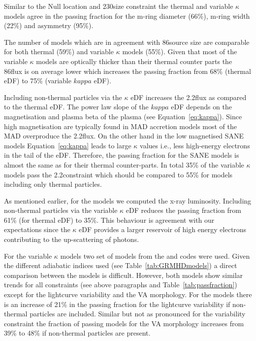 Similar to the Null location and 230\GHz size constraint the thermal and variable $\kappa$ models agree in the passing fraction for the m-ring diameter (66\%), m-ring width (22\%) and asymmetry (95\%).


The number of models which are in agreement with 86\GHz source size are comparable for both thermal (59\%) and variable $\kappa$ models (55\%).
Given that most of the variable $\kappa$ models are optically thicker than their thermal counter parts the 86\GHz flux is on average lower which increases the passing fraction from 68\% (thermal eDF) to 75\% (variable $kappa$ eDF).


Including non-thermal particles via the $\kappa$ eDF increases the 2.2\um flux as compared to the thermal eDF.
The power law slope of the $kappa$ eDF depends on the magnetisation and plasma beta of the plasma (see Equation~\ref{eq:kappa}).
Since high magnetisation are typically found in MAD accretion models most of the MAD overproduce the 2.2\um flux.
On the other hand in the low magnetised SANE models Equation~\ref{eq:kappa} leads to large $\kappa$ values i.e., less high-energy electrons in the tail of the eDF.
Therefore, the passing fraction for the SANE models is almost the same as for their thermal counter-parts.
In total 35\% of the variable $\kappa$ models pass the 2.2\um constraint which should be compared to 55\% for models including only thermal particles.


As mentioned earlier, for the \hamr models we computed the x-ray luminosity.
Including non-thermal particles via the variable $\kappa$ eDF reduces the passing fraction from 61\% (for thermal eDF) to 35\%.
This behaviour is agreement with our expectations since the $\kappa$ eDF provides a larger reservoir of high energy electrons contributing to the up-scattering of photons.


For the variable $\kappa$ models two set of models from the \bhac and \hamr codes were used.
Given the different adiabatic indices used (see Table~\ref{tab:GRMHDmodels}) a direct comparison between the models is difficult.
However, both models show similar trends for all constraints (see above paragraphs and Table~\ref{tab:passfraction}) except for the lightcurve variability and the VA morphology.
For the \hamr models there is an increase of 21\% in the passing fraction for the lightcurve variability if non-thermal particles are included.
Similar but not as pronounced for the variability constraint the fraction of passing models for the VA morphology increases from 39\% to 48\% if non-thermal particles are present.

